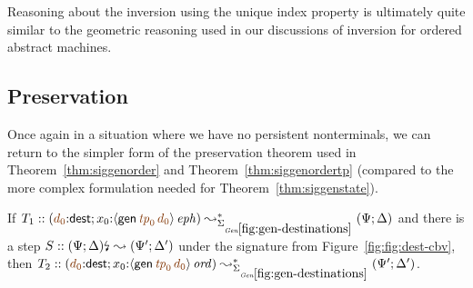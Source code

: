 Reasoning about the inversion using the unique index property is
ultimately quite similar to the geometric reasoning used in our
discussions of inversion for ordered abstract machines.

\subsection{Preservation}

Once again in a situation where we have no persistent nonterminals, we
can return to the simpler form of the preservation theorem used in
Theorem~\ref{thm:siggenorder} and Theorem~\ref{thm:siggenordertp}
(compared to the more complex formulation needed for
Theorem~\ref{thm:siggenstate}).

\medskip
\begin{theorem}
\label{thm:siggendests}
If $T_1 :: (\lf{d_0}{:}{\sf dest}; x_0{:}\iseph{\susp{{\sf gen}\,\lf{{\it tp}_0}\,\lf{d_0}}}) 
   \leadsto^*_{\siggendests} 
   (\Psi; \Delta)$ and there is a step
   $S :: {(\Psi; \Delta)}{\mbox{\lightning}}_{} \leadsto (\Psi'; \Delta')$
under the signature from Figure~\ref{fig:fig:dest-cbv}, then
$T_2 :: (\lf{d_0}{:}{\sf dest}; x_0{:}\istrue{\susp{{\sf gen}\,\lf{{\it tp}_0}\,\lf{d_0}}}) 
   \leadsto^*_{\siggendests} 
   (\Psi'; \Delta')$.
\end{theorem}

